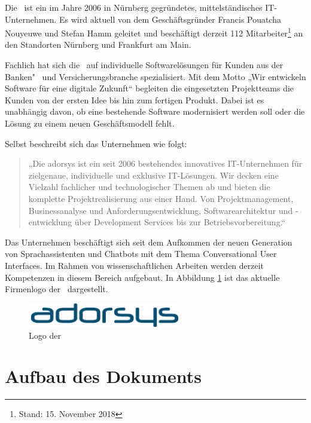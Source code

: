 Die \adorsys \, ist ein im Jahre 2006 in Nürnberg gegründetes, mittelständisches IT-Unternehmen. Es wird aktuell von dem Geschäftsgründer Francis Pouatcha Nouyeuwe und Stefan Hamm geleitet und beschäftigt derzeit 112 Mitarbeiter\footnote{Stand: 15. November 2018}  an den Standorten Nürnberg und Frankfurt am Main.

Fachlich hat sich die \adorsys \, auf individuelle Softwarelösungen für Kunden aus der Banken"~ und Versicherungsbranche spezialisiert. Mit dem Motto „Wir entwickeln Software für eine digitale Zukunft“ begleiten die eingesetzten Projektteams die Kunden von der ersten Idee bis hin zum fertigen Produkt. Dabei ist es unabhängig davon, ob eine bestehende Software modernisiert werden soll oder die Lösung zu einem neuen Geschäftsmodell fehlt. 

Selbst beschreibt sich das Unternehmen wie folgt:
\begin{quote}
    „Die adorsys ist ein seit 2006 bestehendes innovatives IT-Unternehmen für zielgenaue, individuelle und exklusive IT-Lösungen. Wir decken eine Vielzahl fachlicher und technologischer Themen ab und bieten die komplette Projektrealisierung aus einer Hand. Von Projektmanagement, Businessanalyse und Anforderungsentwicklung, Softwarearchitektur und -entwicklung über Development Services bis zur Betriebsvorbereitung.“ \cite{adorsys_gmbh_&_co._kg_company_2018}
\end{quote}

Das Unternehmen beschäftigt sich seit dem Aufkommen der neuen Generation von Sprachassistenten und Chatbots mit dem Thema Conversational User Interfaces. Im Rahmen von wissenschaftlichen Arbeiten werden derzeit Kompetenzen in diesem Bereich aufgebaut.
In Abbildung \ref{fig:logo-adorsys} ist das aktuelle Firmenlogo der \adorsys \, dargestellt.
\newline

\begin{figure}[htb]
    \centering
    \includegraphics[width=0.6\textwidth]{bilder/logo.png}
    \caption{Logo der \adorsys \, \cite{adorsys_gmbh_&_co._kg_company_2018}}
    \label{fig:logo-adorsys}
\end{figure}

\section{Aufbau des Dokuments}
\label{sec:aufbau-des-dokuments}

